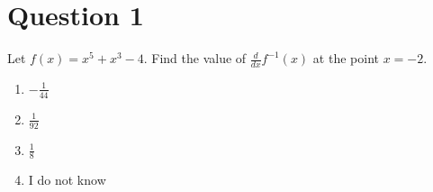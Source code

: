 
\section*{Question 1}
    Let $f(x) = x^5 + x^3 - 4$. Find the value of $\frac{d}{dx}f^{-1}(x)$ at the point $x = -2$.  
    
    \begin{enumerate}[label = \alph*.]
        \item $-\frac{1}{44}$
        \item $\frac{1}{92}$
        \item $\frac{1}{8}$
        \item I do not know
    \end{enumerate}

\setcounter{solutionMainStep}{0}
\setcounter{solutionSubStep}{0}

